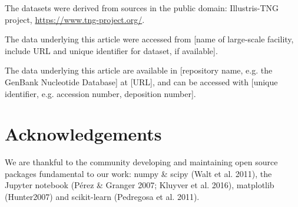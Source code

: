 \documentclass[usenatbib]{mnras}
\begin{document}
The datasets were derived from sources in the public domain: Illustris-TNG project, \url{https://www.tng-project.org/}.

The data underlying this article were accessed from [name of large-scale facility, include URL and unique identifier for dataset, if available].

The data underlying this article are available in [repository name, e.g. the GenBank Nucleotide Database] at [URL], and can be accessed with [unique identifier, e.g. accession number, deposition number].


\section*{Acknowledgements}

We are thankful to the community developing and maintaining open source packages fundamental to our work: numpy
\&  scipy  (Walt  et  al.  2011),  the  Jupyter  notebook  (P\'erez \& Granger 2007; Kluyver et al. 2016), matplotlib (Hunter2007) and  scikit-learn (Pedregosa et al. 2011).






\bsp	%
\label{lastpage}
\end{document}
